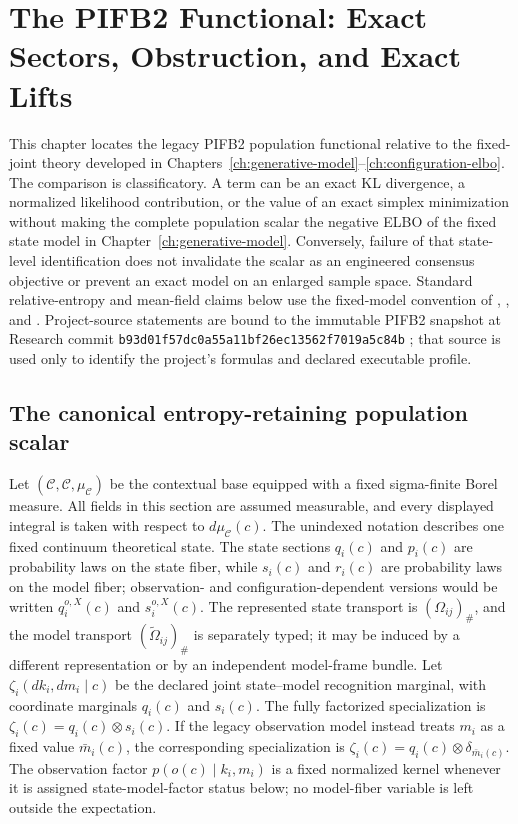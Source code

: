 \chapter{The PIFB2 Functional: Exact Sectors, Obstruction, and Exact Lifts}
\label{ch:pifb2-crosswalk}

This chapter locates the legacy PIFB2 population functional relative to the fixed-joint theory developed in Chapters~\ref{ch:generative-model}--\ref{ch:configuration-elbo}. The comparison is classificatory. A term can be an exact KL divergence, a normalized likelihood contribution, or the value of an exact simplex minimization without making the complete population scalar the negative ELBO of the fixed state model in Chapter~\ref{ch:generative-model}. Conversely, failure of that state-level identification does not invalidate the scalar as an engineered consensus objective or prevent an exact model on an enlarged sample space. Standard relative-entropy and mean-field claims below use the fixed-model convention of \citet{Kullback1951}, \citet{CoverThomas2006}, and \citet{Wainwright2008}. Project-source statements are bound to the immutable PIFB2 snapshot  at Research commit \texttt{b93d01f57dc0a55a11bf26ec13562f7019a5c84b} \citep{Dennis2026PIFB2Snapshot}; that source is used only to identify the project's formulas and declared executable profile.

\section{The canonical entropy-retaining population scalar}

Let \((\mathcal C,\mathscr C,\mu_{\mathcal C})\) be the contextual base equipped with a fixed sigma-finite Borel measure. All fields in this section are assumed measurable, and every displayed integral is taken with respect to \(d\mu_{\mathcal C}(c)\). The unindexed notation describes one fixed continuum theoretical state. The state sections \(q_i(c)\) and \(p_i(c)\) are probability laws on the state fiber, while \(s_i(c)\) and \(r_i(c)\) are probability laws on the model fiber; observation- and configuration-dependent versions would be written \(q_i^{o,X}(c)\) and \(s_i^{o,X}(c)\). The represented state transport is \((\Omega_{ij})_{\#}\), and the model transport \((\widetilde\Omega_{ij})_{\#}\) is separately typed; it may be induced by a different representation or by an independent model-frame bundle. Let \(\zeta_i(dk_i,dm_i\mid c)\) be the declared joint state--model recognition marginal, with coordinate marginals \(q_i(c)\) and \(s_i(c)\). The fully factorized specialization is \(\zeta_i(c)=q_i(c)\otimes s_i(c)\). If the legacy observation model instead treats \(m_i\) as a fixed value \(\bar m_i(c)\), the corresponding specialization is \(\zeta_i(c)=q_i(c)\otimes\delta_{\bar m_i(c)}\). The observation factor \(p(o(c)\mid k_i,m_i)\) is a fixed normalized kernel whenever it is assigned state-model-factor status below; no model-fiber variable is left outside the expectation.

